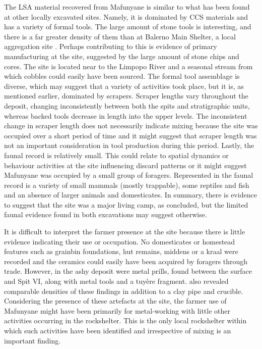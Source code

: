 The LSA material recovered from Mafunyane is similar to what has been found at other locally excavated sites. Namely, it is dominated by CCS materials and has a variety of formal tools. The large amount of stone tools is interesting, and there is a far greater density of them than at Balerno Main Shelter, 
a local aggregation site \parencite{vanDoornum_2008}. Perhaps contributing to this is evidence of primary manufacturing at the site, suggested by the large amount of stone chips and cores. The site is located near to the Limpopo River and a seasonal stream from which cobbles could easily have been sourced. The formal tool assemblage is diverse, 
which may suggest that a variety of activities took place, but it is, as mentioned earlier, dominated by scrapers. Scraper lengths vary throughout the deposit, changing inconsistently between both the spits and stratigraphic units, whereas backed tools decrease in length into the upper levels. The inconsistent change in scraper length does not necessarily indicate mixing because the site was occupied over a short period of time and it might suggest that scraper length was not an important consideration in tool production during this period. Lastly, 
the faunal record is relatively small. This could relate to spatial dynamics or behaviour activities at the site influencing discard patterns or it might suggest Mafunyane was occupied by a small group of foragers. Represented in the faunal record is a variety of small mammals (mostly trappable), some reptiles and fish and an absence of larger animals and domesticates. In summary, there is evidence to suggest that the site was a major living camp, as \textcite{Walker_1994} concluded, but the limited faunal evidence found in both excavations may suggest otherwise.

It is difficult to interpret the farmer presence at the site because there is little evidence indicating their use or occupation. No domesticates or homestead features such as grainbin foundations, hut remains, middens or a kraal were recorded and the ceramics could easily have been acquired by foragers through trade. However, in the ashy deposit were metal prills, found between the surface and Spit VI, along with metal tools and a tuyère fragment. \textcite{Walker_1994} also revealed comparable densities of these findings in addition to a clay pipe and crucible. Considering the presence of these artefacts at the site, the farmer use of Mafunyane might have been primarily for metal-working with little other activities occurring in the rockshelter. This is the only local rockshelter within which such activities have been identified and irrespective of mixing is an important finding.

